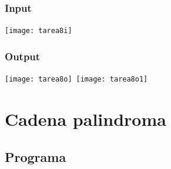 \documentclass[11pt,a4paper]{report}
\begin{document}
			\subsection{Input}
\texttt{[image: tarea8i]}\
			\subsection{Output}
\texttt{[image: tarea8o]}\
\texttt{[image: tarea8o1]}\

	\chapter{Cadena palindroma}
		\section{Programa}
\end{document}
